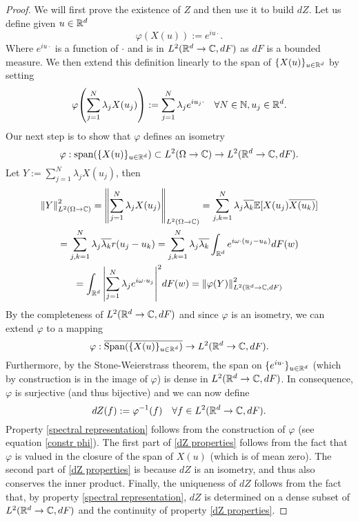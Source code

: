 \documentclass[12pt]{article}
\begin{document}
\begin{proof}
    We will first prove the existence of $Z$ and then use it to build $dZ$. Let us define given $u\in{\mathbb R}^d$
    \begin{equation}\label{constr phi}
        \varphi(X(u)):=e^{iu\cdot}.
    \end{equation}
    Where $e^{iu\cdot}$ is a function of $\cdot$ and is in $L^2({\mathbb R}^d\to\mathbb{C},dF)$ as $dF$ is a bounded measure. We then extend this definition linearly to the span of $\{X(u)\}_{u\in{\mathbb R}^d}$ by setting
    \begin{equation*}
        \varphi\qty(\sum_{j=1}^N\lambda_j X(u_j)):=\sum_{j=1}^N\lambda_j e^{iu_j\cdot}\quad\forall N\in \mathbb{N},u_j\in{\mathbb R}^d.
    \end{equation*}
    Our next step is to show that $\varphi$ defines an isometry $$\varphi:\text{span}(\{X(u)\}_{u\in{\mathbb R}^d})\subset L^2(\Omega\to\mathbb{C})\to L^2({\mathbb R}^d\to\mathbb{C},dF).$$
    Let $Y:=\sum_{j=1}^N\lambda_j X(u_j)$, then
    \begin{multline*}
        \norm{Y}_{L^2(\Omega\to\mathbb{C})}^2=\norm{\sum_{j=1}^N\lambda_j X(u_j)}_{L^2(\Omega\to\mathbb{C})}=\sum_{j,k=1}^N\lambda_j\overline{\lambda_k} \mathbb{E}[X(u_j)\overline{X(u_k)}]\\=\sum_{j,k=1}^N\lambda_j\overline{\lambda_k} r(u_j-u_k)
        =\sum_{j,k=1}^N\lambda_j\overline{\lambda_k} \int_{{\mathbb R}^d}e^{i\omega\cdot(u_j-u_k)}dF(w) \\= \int_{{\mathbb R}^d}\abs{\sum_{j=1}^N\lambda_je^{i\omega\cdot u_j}}^2dF(w)=\norm{\varphi(Y)}_{L^2({\mathbb R}^d\to\mathbb{C},dF)}^2
    \end{multline*}
    By the completeness of $L^2({\mathbb R}^d\to\mathbb{C}, dF)$ and since $\varphi$ is an isometry, we can extend $\varphi$ to a mapping
    $$\varphi:\overline{\text{Span}(\{X(u)\}_{u\in{\mathbb R}^d})}\to L^2({\mathbb R}^d\to\mathbb{C},dF).$$ Furthermore, by the Stone-Weierstrass theorem, the span on $\{e^{iu\cdot}\}_{u\in{\mathbb R}^d}$ (which by construction is in the image of $\varphi$) is dense in $L^2({\mathbb R}^d\to\mathbb{C},dF)$. In consequence,  $\varphi$ is surjective (and thus bijective) and we can now define
    \begin{equation*}
        dZ(f):=\varphi^{-1}(f)\quad\forall f\in L^2({\mathbb R}^d\to\mathbb{C},dF).
    \end{equation*}
    Property \eqref{spectral representation} follows from the construction of $\varphi$ (see equation \eqref{constr phi}). The first part of \eqref{dZ properties} follows from the fact that $\varphi$ is valued in the closure of the span of $X(u)$ (which is of mean zero). The second part of \eqref{dZ properties} is because $dZ$ is an isometry, and thus also conserves the inner product. Finally, the uniqueness of $dZ$ follows from the fact that, by property \eqref{spectral representation}, $dZ$ is determined on a dense subset of $L^2({\mathbb R}^d\to\mathbb{C},dF)$ and the continuity of property \eqref{dZ properties}.
\end{proof}
\end{document}
